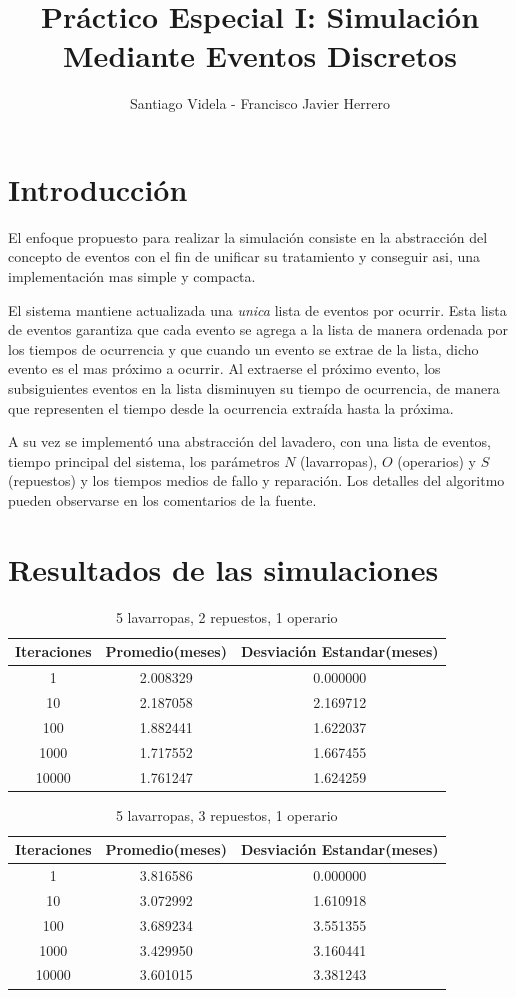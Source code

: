 \documentclass[10pt,a4paper]{article}
\author{Santiago Videla - Francisco Javier Herrero}
\title{Pr\'actico Especial I: Simulaci\'on Mediante Eventos Discretos}
\begin{document}
\maketitle
\newpage
\tableofcontents
\newpage
\section{Introducci\'on}
El enfoque propuesto para realizar la simulaci\'on consiste en la abstracci\'on
del concepto de eventos con el fin de unificar su tratamiento y conseguir asi,
una implementaci\'on mas simple y compacta.

El sistema mantiene actualizada una \textit{unica} lista de eventos por ocurrir. 
Esta lista de eventos garantiza que cada evento se agrega a la lista de manera
ordenada por los tiempos de ocurrencia y que cuando un evento se extrae de
la lista, dicho evento es el mas pr\'oximo a ocurrir. Al extraerse el pr\'oximo evento, 
los subsiguientes eventos en la lista disminuyen su tiempo de ocurrencia, de manera
que representen el tiempo desde la ocurrencia extra\'ida hasta la pr\'oxima.  

A su vez se implement\'o una abstracci\'on del lavadero, con una lista de eventos,  
tiempo principal del sistema, los par\'ametros $N$ (lavarropas), $O$ (operarios) y 
$S$ (repuestos) y los tiempos medios de fallo y reparaci\'on. 
Los detalles del algoritmo pueden observarse en los comentarios de la fuente.

\section{Resultados de las simulaciones}

\begin{table}[ht]
\caption{5 lavarropas, 2 repuestos, 1 operario}
\centering
\begin{tabular}{c c c}
\hline\hline
Iteraciones & Promedio(meses) & Desviaci\'on Estandar(meses) \\ [0.5ex]
\hline
1 & 2.008329 & 0.000000 \\
10  & 2.187058 & 2.169712 \\
100 & 1.882441 & 1.622037 \\
1000 & 1.717552 & 1.667455 \\
10000 & 1.761247 & 1.624259 \\
\hline
\end{tabular}
\end{table}

\begin{table}[ht]
\caption{5 lavarropas, 3 repuestos, 1 operario}
\centering
\begin{tabular}{c c c}
\hline\hline
Iteraciones & Promedio(meses) & Desviaci\'on Estandar(meses) \\ [0.5ex]
\hline
1 & 3.816586 & 0.000000\\
10 & 3.072992 & 1.610918\\
100 & 3.689234 & 3.551355\\
1000 & 3.429950 & 3.160441\\
10000 & 3.601015 & 3.381243\\
\hline
\end{tabular}
\end{table}
\end{document}
